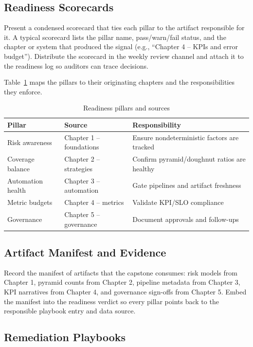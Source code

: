 \subsection{Readiness Scorecards}

Present a condensed scorecard that ties each pillar to the artifact responsible for it. A typical scorecard lists the pillar name, pass/warn/fail status, and the chapter or system that produced the signal (e.g., “Chapter 4 – KPIs and error budget”). Distribute the scorecard in the weekly review channel and attach it to the readiness log so auditors can trace decisions.

Table~\ref{tab:readiness-pillars} maps the pillars to their originating chapters and the responsibilities they enforce.

\begin{table}[h]
\centering
\caption{Readiness pillars and sources}
\label{tab:readiness-pillars}
\begin{tabular}{p{3cm}p{5cm}p{4cm}}
\toprule
Pillar & Source & Responsibility \\
\midrule
Risk awareness & Chapter 1 – foundations & Ensure nondeterministic factors are tracked \\
Coverage balance & Chapter 2 – strategies & Confirm pyramid/doughnut ratios are healthy \\
Automation health & Chapter 3 – automation & Gate pipelines and artifact freshness \\
Metric budgets & Chapter 4 – metrics & Validate KPI/SLO compliance \\
Governance & Chapter 5 – governance & Document approvals and follow-ups \\
\bottomrule
\end{tabular}
\end{table}

\subsection{Artifact Manifest and Evidence}

Record the manifest of artifacts that the capstone consumes: risk models from Chapter 1, pyramid counts from Chapter 2, pipeline metadata from Chapter 3, KPI narratives from Chapter 4, and governance sign-offs from Chapter 5. Embed the manifest into the readiness verdict so every pillar points back to the responsible playbook entry and data source.

\subsection{Remediation Playbooks}

